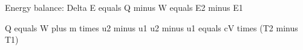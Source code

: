 Energy balance:  
Delta E equals Q minus W equals E2 minus E1  

Q equals W plus m times u2 minus u1  
u2 minus u1 equals cV times (T2 minus T1)